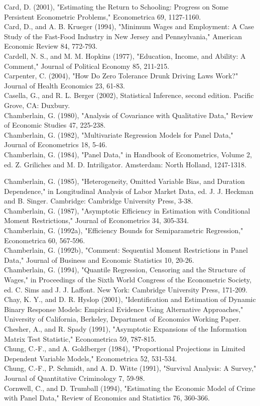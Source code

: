 \documentclass[10pt]{article}
\begin{document}
Card, D. (2001), "Estimating the Return to Schooling: Progress on Some Persistent Econometric Problems," Econometrica 69, 1127-1160.\\
Card, D., and A. B. Krueger (1994), "Minimum Wages and Employment: A Case Study of the Fast-Food Industry in New Jersey and Pennsylvania," American Economic Review 84, 772-793.\\
Cardell, N. S., and M. M. Hopkins (1977), "Education, Income, and Ability: A Comment," Journal of Political Economy 85, 211-215.\\
Carpenter, C. (2004), "How Do Zero Tolerance Drunk Driving Laws Work?" Journal of Health Economics 23, 61-83.\\
Casella, G., and R. L. Berger (2002), Statistical Inference, second edition. Pacific Grove, CA: Duxbury.\\
Chamberlain, G. (1980), "Analysis of Covariance with Qualitative Data," Review of Economic Studies 47, 225-238.\\
Chamberlain, G. (1982), "Multivariate Regression Models for Panel Data," Journal of Econometrics 18, 5-46.\\
Chamberlain, G. (1984), "Panel Data," in Handbook of Econometrics, Volume 2, ed. Z. Griliches and M. D. Intriligator. Amsterdam: North Holland, 1247-1318.

Chamberlain, G. (1985), "Heterogeneity, Omitted Variable Bias, and Duration Dependence," in Longitudinal Analysis of Labor Market Data, ed. J. J. Heckman and B. Singer. Cambridge: Cambridge University Press, 3-38.\\
Chamberlain, G. (1987), "Asymptotic Efficiency in Estimation with Conditional Moment Restrictions," Journal of Econometrics 34, 305-334.\\
Chamberlain, G. (1992a), "Efficiency Bounds for Semiparametric Regression," Econometrica 60, 567-596.\\
Chamberlain, G. (1992b), "Comment: Sequential Moment Restrictions in Panel Data," Journal of Business and Economic Statistics 10, 20-26.\\
Chamberlain, G. (1994), "Quantile Regression, Censoring and the Structure of Wages," in Proceedings of the Sixth World Congress of the Econometric Society, ed. C. Sims and J. J. Laffont. New York: Cambridge University Press, 171-209.\\
Chay, K. Y., and D. R. Hyslop (2001), "Identification and Estimation of Dynamic Binary Response Models: Empirical Evidence Using Alternative Approaches," University of California, Berkeley, Department of Economics Working Paper.\\
Chesher, A., and R. Spady (1991), "Asymptotic Expansions of the Information Matrix Test Statistic," Econometrica 59, 787-815.\\
Chung, C.-F., and A. Goldberger (1984), "Proportional Projections in Limited Dependent Variable Models," Econometrica 52, 531-534.\\
Chung, C.-F., P. Schmidt, and A. D. Witte (1991), "Survival Analysis: A Survey," Journal of Quantitative Criminology 7, 59-98.\\
Cornwell, C., and D. Trumball (1994), "Estimating the Economic Model of Crime with Panel Data," Review of Economics and Statistics 76, 360-366.
\end{document}
